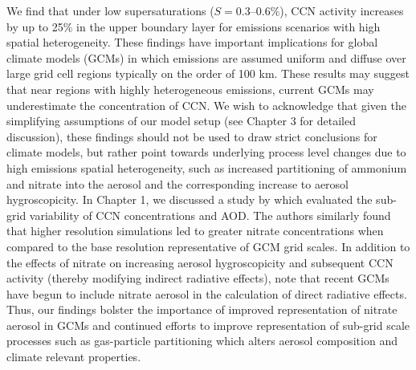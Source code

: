 We find that under low supersaturations ($S=0.3\mbox{--}0.6\%$), CCN activity increases by up to 25\% in the upper boundary layer for emissions scenarios with high spatial heterogeneity. These findings have important implications for global climate models (GCMs) in which emissions are assumed uniform and diffuse over large grid cell regions typically on the order of 100 km. These results may suggest that near regions with highly heterogeneous emissions, current GCMs may underestimate the concentration of CCN. We wish to acknowledge that given the simplifying assumptions of our model setup (see Chapter 3 for detailed discussion), these findings should not be used to draw strict conclusions for climate models, but rather point towards underlying process level changes due to high emissions spatial heterogeneity, such as increased partitioning of ammonium and nitrate into the aerosol and the corresponding increase to aerosol hygroscopicity. In Chapter 1, we discussed a study by \textcite{weigum_effect_2016} which evaluated the sub-grid variability of CCN concentrations and AOD. The authors similarly found that higher resolution simulations led to greater nitrate concentrations when compared to the base resolution representative of GCM grid scales. In addition to the effects of nitrate on increasing aerosol hygroscopicity and subsequent CCN activity (thereby modifying indirect radiative effects), \textcite{weigum_effect_2016} note that recent GCMs have begun to include nitrate aerosol in the calculation of direct radiative effects. Thus, our findings bolster the importance of improved representation of nitrate aerosol in GCMs and continued efforts to improve representation of sub-grid scale processes such as gas-particle partitioning which alters aerosol composition and climate relevant properties.





